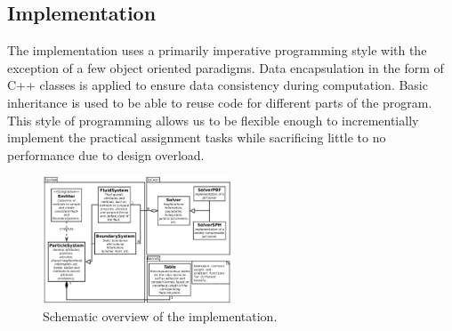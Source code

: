 \documentclass[11pt, letterpaper, twocolumn]{article}
\begin{document}


\subsection{Implementation}
The implementation uses a primarily imperative programming style with the exception of a few object oriented paradigms. Data encapsulation in the form of C++ classes is applied to ensure data consistency during computation. Basic inheritance is used to be able to reuse code for different parts of the program. This style of programming allows us to be flexible enough to incrementially implement the practical assignment tasks while sacrificing little to no performance due to design overload.
\begin{figure}[ht]
    \centering
    \includegraphics[width=0.5\textwidth]{images/system.pdf}
    \caption{Schematic overview of the implementation.}
    \label{fig:systemuml}
\end{figure}
  
\end{document}
